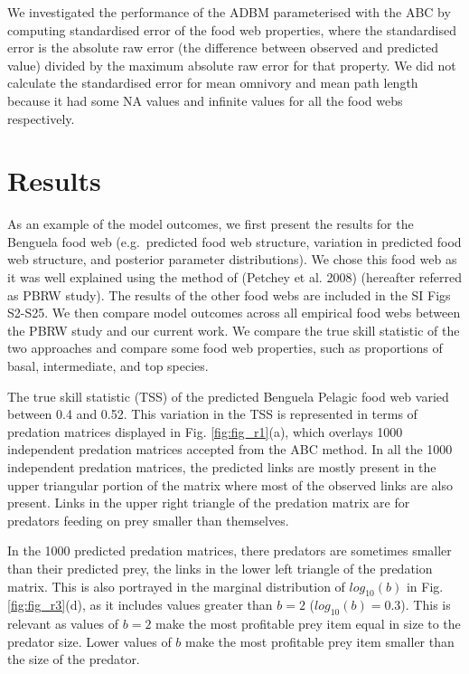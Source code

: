\documentclass{article}
\begin{document}
We investigated the performance of the ADBM parameterised with the ABC
by computing standardised error of the food web properties, where the
standardised error is the absolute raw error (the difference between
observed and predicted value) divided by the maximum absolute raw error
for that property. We did not calculate the standardised error for mean
omnivory and mean path length because it had some NA values and infinite
values for all the food webs respectively.

\hypertarget{results}{%
\section{Results}\label{results}}

As an example of the model outcomes, we first present the results for
the Benguela food web (e.g.~predicted food web structure, variation in
predicted food web structure, and posterior parameter distributions). We
chose this food web as it was well explained using the method of
(Petchey et al. 2008) (hereafter referred as PBRW study). The results of
the other food webs are included in the SI Figs S2-S25. We then compare
model outcomes across all empirical food webs between the PBRW study and
our current work. We compare the true skill statistic of the two
approaches and compare some food web properties, such as proportions of
basal, intermediate, and top species.

The true skill statistic (TSS) of the predicted Benguela Pelagic food
web varied between 0.4 and 0.52. This variation in the TSS is
represented in terms of predation matrices displayed in Fig.
\ref{fig:fig_r1}(a), which overlays 1000 independent predation matrices
accepted from the ABC method. In all the 1000 independent predation
matrices, the predicted links are mostly present in the upper triangular
portion of the matrix where most of the observed links are also present.
Links in the upper right triangle of the predation matrix are for
predators feeding on prey smaller than themselves.

In the 1000 predicted predation matrices, there predators are sometimes
smaller than their predicted prey, the links in the lower left triangle
of the predation matrix. This is also portrayed in the marginal
distribution of \(log_{10}(b)\) in Fig. \ref{fig:fig_r3}(d), as it
includes values greater than \(b=2\) (\(log_{10}(b)=0.3\)). This is
relevant as values of \(b=2\) make the most profitable prey item equal
in size to the predator size. Lower values of \(b\) make the most
profitable prey item smaller than the size of the predator.
\end{document}
